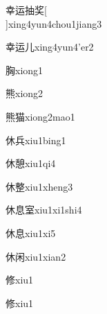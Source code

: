 \begin{verbete}[8;7;8;9]{幸运抽奖}[\\]{xing4yun4chou1jiang3}
\end{verbete}

\begin{verbete}[8;7;2]{幸运儿}{xing4yun4'er2}
\end{verbete}

\begin{verbete}[10]{胸}{xiong1}
\end{verbete}

\begin{verbete}[14]{熊}{xiong2}
\end{verbete}

\begin{verbete}[14;11]{熊猫}{xiong2mao1}
\end{verbete}

\begin{verbete}[6;7]{休兵}{xiu1bing1}
\end{verbete}

\begin{verbete}[6;16]{休憩}{xiu1qi4}
\end{verbete}

\begin{verbete}[6;16]{休整}{xiu1xheng3}
\end{verbete}

\begin{verbete}[6;10;9]{休息室}{xiu1xi1shi4}
\end{verbete}

\begin{verbete}[6;10]{休息}{xiu1xi5}
\end{verbete}

\begin{verbete}[6;7]{休闲}{xiu1xian2}
\end{verbete}

\begin{verbete}[9]{修}{xiu1}
\end{verbete}
\begin{verbete*}[9]{修}{xiu1}
\end{verbete*}

